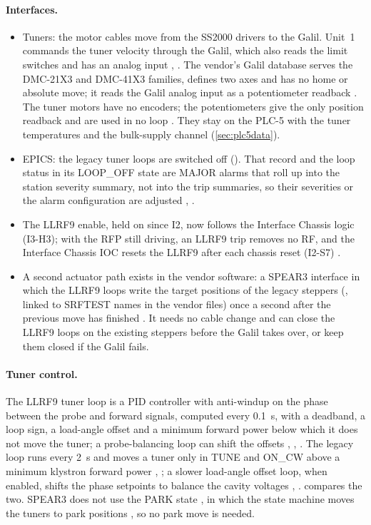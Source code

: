 \paragraph{Interfaces.}
\begin{itemize}
\item Tuners: the motor cables move from the SS2000 drivers to the Galil. Unit~1
commands the tuner velocity through the Galil, which also reads the limit switches
and has an analog input , . The vendor's Galil database serves the
DMC-21X3 and DMC-41X3 families, defines two axes and has no home or absolute move; it
reads the Galil analog input as a potentiometer readback . The tuner motors have
no encoders; the potentiometers give the only position readback and are used in no
loop . They stay on the PLC-5 with the tuner temperatures and the bulk-supply
channel (\cref{sec:plc5data}).
\item EPICS: the legacy tuner loops are switched off ().
That record and the loop status in its LOOP\_OFF state are MAJOR alarms that roll up
into the station severity summary, not into the trip summaries, so their severities
or the alarm configuration are adjusted , .
\item The LLRF9 enable, held on since I2, now follows the Interface Chassis logic
(I3-H3); with the RFP still driving, an LLRF9 trip removes no RF, and the Interface
Chassis IOC resets the LLRF9 after each chassis reset (I2-S7) .
\item A second actuator path exists in the vendor software: a SPEAR3 interface in which
the LLRF9 loops write the target positions of the legacy steppers
(, linked to SRFTEST names in the vendor files) once a
second after the previous move has finished . It needs no cable change and can
close the LLRF9 loops on the existing steppers before the Galil takes over, or keep
them closed if the Galil fails.
\end{itemize}

\paragraph{Tuner control.} The LLRF9 tuner loop is a PID controller with anti-windup on
the phase between the probe and forward signals, computed every \qty{0.1}{\second},
with a deadband, a loop sign, a load-angle offset and a minimum forward power below
which it does not move the tuner; a probe-balancing loop can shift the offsets
, , . The legacy loop runs every \qty{2}{\second} and
moves a tuner only in TUNE and ON\_CW above a minimum klystron forward power ,
; a slower load-angle offset loop, when enabled, shifts the phase setpoints to
balance the cavity voltages , .  compares the two.
SPEAR3 does not use the PARK state , in which the state machine moves the tuners
to park positions , so no park move is needed.

